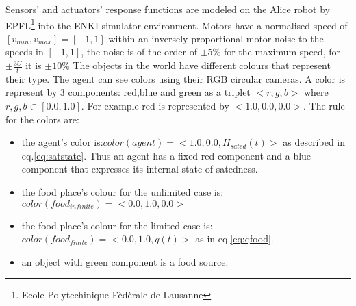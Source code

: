 Sensors' and actuators' response functions are modeled on the Alice robot by
EPFL\footnote{Ecole Polytechinique Fèdèrale de Lausanne} into the ENKI simulator environment.
Motors have a normalised speed of $[v_{min},v_{max}]=[-1,1] $ within an inversely
proportional motor noise to the speeds in $[-1,1] $, the noise is of the order
of $\pm 5\%$ for the maximum speed, for $\pm \frac{3 U}{t}$ it is $\pm 10\%$
The objects in the world have different colours that represent their type.
The agent can see colors using their RGB circular cameras.
A color is represent by 3 components: red,blue and green as a triplet $<r,g,b>$
where $r,g,b \subset [0.0,1.0]$. For example red is represented by $<1.0,0.0,0.0>$.
The rule for the colors are:
\begin{itemize}
 \item the agent's color is:$color(agent)=<1.0,0.0,H_{sated}(t)>$ as described in eq.\ref{eq:satstate}.
Thus an agent has a fixed red component and a blue component that expresses its internal state of satedness.
\item the food place's colour for the unlimited case is:$color(food_{infinite})=<0.0,1.0,0.0>$
\item the food place's colour for the limited case is:$color(food_{finite})=<0.0,1.0,q(t)>$ as in eq.\ref{eq:qfood}.
\item an object with green component is a food source.
\end{itemize}


